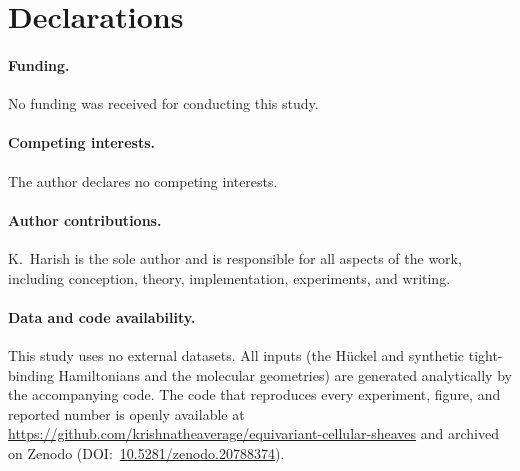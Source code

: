 \documentclass[pdflatex,sn-mathphys-num]{sn-jnl}%
\theoremstyle{thmstyleone}
\theoremstyle{thmstyletwo}
\theoremstyle{thmstylethree}
\begin{document}
\section*{Declarations}

\paragraph{Funding.}
No funding was received for conducting this study.

\paragraph{Competing interests.}
The author declares no competing interests.

\paragraph{Author contributions.}
K.~Harish is the sole author and is responsible for all aspects of the work,
including conception, theory, implementation, experiments, and writing.

\paragraph{Data and code availability.}
This study uses no external datasets. All inputs (the H\"uckel and synthetic
tight-binding Hamiltonians and the molecular geometries) are generated
analytically by the accompanying code. The code that reproduces every
experiment, figure, and reported number is openly available at
\url{https://github.com/krishnatheaverage/equivariant-cellular-sheaves} and
archived on Zenodo (DOI:~\href{https://doi.org/10.5281/zenodo.20788374}{10.5281/zenodo.20788374}).
\end{document}
